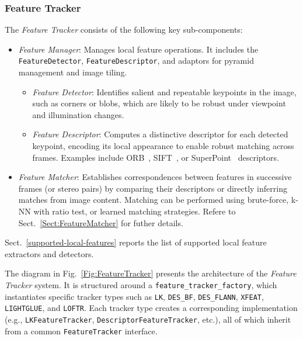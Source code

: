 \documentclass{article}
\begin{document}
\subsubsection{Feature Tracker}

The \textit{Feature Tracker} consists of the following key sub-components:

\begin{itemize} 
\item \textit{Feature Manager}: Manages local feature operations. It includes the \texttt{FeatureDetector}, \texttt{FeatureDescriptor}, and adaptors for pyramid management and image tiling. 
\begin{itemize}
\item \textit{Feature Detector}: Identifies salient and repeatable keypoints in the image, such as corners or blobs, which are likely to be robust under viewpoint and illumination changes. 

\item \textit{Feature Descriptor}: Computes a distinctive descriptor for each detected keypoint, encoding its local appearance to enable robust matching across frames. Examples include ORB~\cite{rublee2011orb}, SIFT~\cite{lowe1999object}, or SuperPoint~\cite{detone18superpoint} descriptors.

\end{itemize}

\item \textit{Feature Matcher}: Establishes correspondences between features in successive frames (or stereo pairs) by comparing their descriptors or directly inferring matches from image content. Matching can be performed using brute-force, k-NN with ratio test, or learned matching strategies. Refere to Sect.~\ref{Sect:FeatureMatcher} for futher details.
\end{itemize}

Sect.~\ref{supported-local-features} reports the list of supported local feature extractors and detectors.

The diagram in Fig.~\ref{Fig:FeatureTracker} presents the architecture of the \textit{Feature Tracker} system. It is structured around a \texttt{feature\_tracker\_factory}, which instantiates specific tracker types such as \texttt{LK}, \texttt{DES\_BF}, \texttt{DES\_FLANN}, \texttt{XFEAT}, \texttt{LIGHTGLUE}, and \texttt{LOFTR}. Each tracker type creates a corresponding implementation (e.g., \texttt{LKFeatureTracker}, \texttt{DescriptorFeatureTracker}, etc.), all of which inherit from a common \texttt{FeatureTracker} interface.
\end{document}

